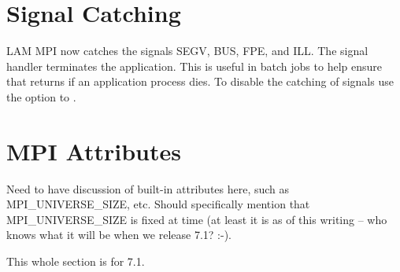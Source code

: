 \section{Signal Catching}

LAM MPI now catches the signals SEGV, BUS, FPE, and ILL.  The signal
handler terminates the application. This is useful in batch jobs to
help ensure that  returns if an application process dies.
To disable the catching of signals use the  option to
.


\section{MPI Attributes}

\begin{discuss}
  Need to have discussion of built-in attributes here, such as
  MPI\_\-UNIVERSE\_\-SIZE, etc.  Should specifically mention that
  MPI\_\-UNIVERSE\_\-SIZE is fixed at  time (at
  least it is as of this writing -- who knows what it will be when we
  release 7.1? :-).

  This whole section is for 7.1.
\end{discuss}
